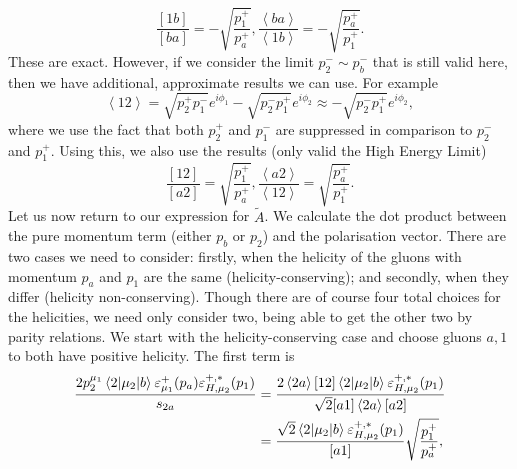 \begin{subequations}
\begin{equation}
\frac{[1b]}{[ba]} = -\sqrt{\frac{p_1^+}{p_a^+}},
\end{equation}
\begin{equation}
\frac{\left<ba\right>}{\left<1b\right>} = -\sqrt{\frac{p_a^+}{p_1^+}}.
\end{equation}
\end{subequations}
These are exact. However, if we consider the limit $p_2^- \sim p_b^-$ that is still valid here, then we have additional, approximate results we can use. For example
\begin{equation}
\left<1 2 \right> = \sqrt{p_2^+ p_1^-} e^{i \phi_1} - \sqrt{p_2^- p_1^+}e^{i \phi_2} \approx  - \sqrt{p_2^- p_1^+}e^{i \phi_2},
\end{equation}
where we use the fact that both $p_2^+$ and $p_1^-$ are suppressed in comparison to $p_2^-$ and $p_1^+$. Using this, we also use the results (only valid the High Energy Limit)
\begin{subequations}
\begin{equation}
\frac{[12]}{[a2]} = \sqrt{\frac{p_1^+}{p_a^+}},
\end{equation}
\begin{equation}
\frac{\left<a2\right>}{\left<12\right>} = \sqrt{\frac{p_a^+}{p_1^+}}.
\end{equation}
\end{subequations}
Let us now return to our expression for $\tilde{A}$. We calculate the dot product between the pure momentum term (either $p_b$ or $p_2$) and the polarisation vector. There are two cases we need to consider: firstly, when the helicity of the gluons with momentum $p_a$ and $p_1$ are the same (helicity-conserving); and secondly, when they differ (helicity non-conserving). Though there are of course four total choices for the helicities, we need only consider two, being able to get the other two by parity relations. We start with the helicity-conserving case and choose gluons $a,1$ to both have positive helicity. The first term is 
\begin{equation}
\begin{split}
 \frac{2 p_2^{\mu_1} \mathinner{\langle2\vert\mu_2\vert b\rangle}_{} \varepsilon_{\mu_1}^+ (p_a) \varepsilon_{H,\mu_2}^{+,*}(p_1)}{s_{2a}} &= \frac{2 \left<2 a \right> [1 2] \mathinner{\langle2\vert\mu_2\vert b\rangle}_{}\varepsilon_{H,\mu_2}^{+,*}(p_1)}{\sqrt{2}[a 1] \left<2 a \right> [a 2]} \\
 &= \frac{\sqrt{2}\mathinner{\langle2\vert\mu_2\vert b\rangle}_{}\varepsilon_{H,\mu_2}^{+,*}(p_1)}{[a1]} \sqrt{\frac{p_1^+}{p_a^+}},
 \end{split}
\end{equation}
